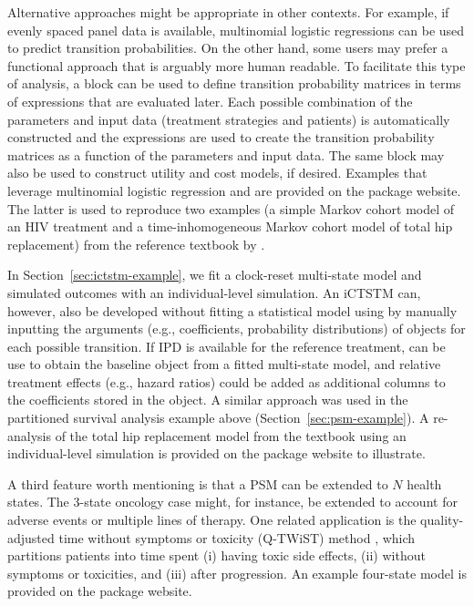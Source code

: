 \documentclass[article, nojss]{jss}\usepackage[]{graphicx}\usepackage[]{color}
\begin{document}
Alternative approaches might be appropriate in other contexts. For example, if evenly spaced panel data is available, multinomial logistic regressions can be used to predict transition probabilities. On the other hand, some users may prefer a functional approach that is arguably more human readable. To facilitate this type of analysis, a  block can be used to define transition probability matrices in terms of expressions that are evaluated later. Each possible combination of the parameters and input data (treatment strategies and patients) is automatically constructed and the expressions are used to create the transition probability matrices as a function of the parameters and input data. The same  block may also be used to construct utility and cost models, if desired. Examples that leverage multinomial logistic regression and  are provided on the package website. The latter is used to reproduce two examples (a simple Markov cohort model of an HIV treatment and a time-inhomogeneous Markov cohort model of total hip replacement) from the reference textbook by \citet{briggs2006decision}.

In Section~\ref{sec:ictstm-example}, we fit a clock-reset multi-state model and simulated outcomes with an individual-level simulation. An iCTSTM can, however, also be developed without fitting a statistical model using  by manually inputting the arguments (e.g., coefficients, probability distributions) of  objects for each possible transition. If IPD is available for the reference treatment,  can be use to obtain the baseline  object from a fitted multi-state model, and relative treatment effects (e.g., hazard ratios) could be added as additional columns to the coefficients stored in the  object. A similar approach was used in the partitioned survival analysis example above (Section~\ref{sec:psm-example}). A re-analysis of the total hip replacement model from the \citet{briggs2006decision} textbook using an individual-level simulation is provided on the package website to illustrate. 

A third feature worth mentioning is that a PSM can be extended to $N$ health states. The 3-state oncology case might, for instance, be extended to account for adverse events or multiple lines of therapy. One related application is the quality-adjusted time without symptoms or toxicity (Q-TWiST) method \citep{goldhirsch1989costs, lenderking1994eval}, which partitions patients into time spent (i) having toxic side effects, (ii) without symptoms or toxicities, and (iii) after progression. An example four-state model is provided on the package website. 
\end{document}
